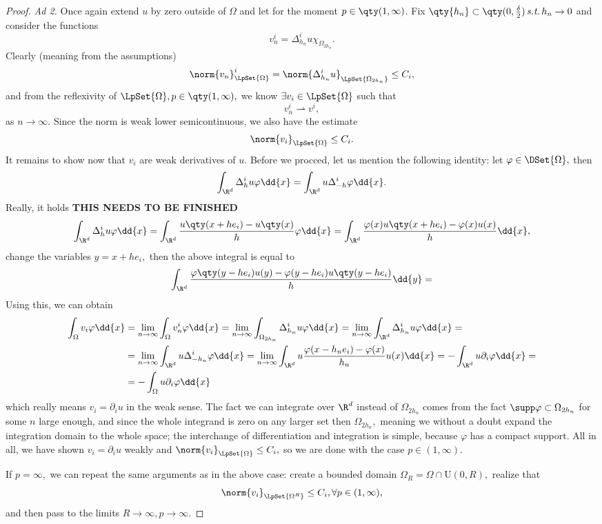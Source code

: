\begin{proof}
	\textit{Ad 2.}
	Once again extend $u$ by zero outside of $\Omega$ and let for the moment $p \in \qty(1,\infty)$. Fix $\qty{h_n} \subset \qty(0, \frac{\delta}{2}) \, \text{\textit{s.t.}} \, h_n \to 0$ and consider the functions
	\[
		v_n^i = \Delta_{h_n}^i u \chi_{\Omega_{2 h_n}}.
	\]
	Clearly (meaning from the assumptions)
	\[
		\norm{v_n}^i_{\LpSet{\Omega}} = \norm{\Delta^i_{{h_n}} u}_{\LpSet{\Omega_{2 h_n}}}  \leq C_i,
	\]
	and from the reflexivity of $\LpSet{\Omega}, p \in \qty(1, \infty),$ we know $\exists v_i \in \LpSet{\Omega}$ such that
	\[
		v_n^i \rightharpoonup v^i,
	\]
	as $n \to \infty.$ Since the norm is weak lower semicontinuous, we also have the estimate
	\[
		\norm{v_i}_{\LpSet{\Omega}} \leq C_i.
	\]
	It remains to show now that $v_i$ are weak derivatives of $u$. Before we procced, let us mention the following identity: let $\varphi \in \DSet{\Omega},$ then
	\[
		\int_{\R^{d}}\Delta_h^i u \varphi\dd{x} = \int_{\R^{d}}u \Delta_{-h}^i \varphi\dd{x}.
	\]
	Really, it holds \textbf{THIS NEEDS TO BE FINISHED}
	\[
		\int_{\R^{d}}\Delta_h^i u \varphi\dd{x} = \int_{\R^{d}}\frac{u\qty(x+he_i) - u\qty(x)}{h}\varphi\dd{x} = \int_{\R^{d}}\frac{\varphi(x) u\qty(x+he_i) - \varphi(x) u(x)}{h}\dd{x},
	\]
	change the variables $y = x+ he_i,$ then the above integral is equal to
	\[
		\int_{\R^{d}}\frac{\varphi\qty(y - he_i)u(y) - \varphi(y - he_i) u\qty(y-he_i)}{h}\dd{y} =
	\]
	Using this, we can obtain 
	\begin{align*}
		\int_{\Omega}v_i \varphi\dd{x} &= \lim_{n \to \infty}\int_{\Omega}v_n^i \varphi \dd{x} = \lim_{n \to \infty}\int_{\Omega_{2h_n}}\Delta_{h_n}^i u \varphi\dd{x} = \lim_{n \to \infty} \int_{\R^{d}}\Delta_{h_n}^i u \varphi\dd{x} = \\
					       &= \lim_{n\to \infty}\int_{\R^{d}}u \Delta_{-h_n}^i \varphi \dd{x} = \lim_{n \to \infty}\int_{\R^{d}}u \frac{\varphi(x- h_n e_i) - \varphi(x)}{h_n}u(x)\dd{x} =  -\int_{\R^{d}}u \partial_{i}\varphi\dd{x} = \\
					       &=- \int_{\Omega}u \partial_{i} \varphi \dd{x}
	\end{align*}
which really means $v_i = \partial_{i} u$ in the weak sense. The fact we can integrate over $\R^{d}$ instead of $\Omega_{2h_n}$ comes from the fact $\supp \varphi \subset \Omega_{2h_n}$ for some $n$ large enough, and since the whole integrand is zero on any larger set then $\Omega_{2h_n},$ meaning we without a doubt expand the integration domain to the whole space; the interchange of differentiation and integration is simple, because $\varphi$ has a compact support. All in all, we have shown $v_i = \partial_{i} u$ weakly and $\norm{v_i}_{\LpSet{\Omega}} \leq C_i,$ so we are done with the case $p \in (1, \infty).$

If $p = \infty,$ we can repeat the same arguments as in the above case: create a bounded domain $\Omega_R = \Omega \cap \text{U}(0,R),$ realize that
\[
	\norm{v_i}_{\LpSet{\Omega^R}} \leq C_i, \forall p \in (1, \infty),
\]
and then pass to the limits $R \to \infty, p \to \infty.$

\end{proof}
